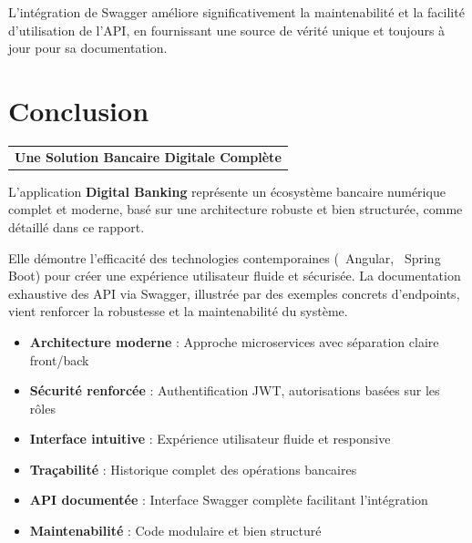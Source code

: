 \documentclass[10pt]{article}
\begin{document}
L'intégration de Swagger améliore significativement la maintenabilité et la facilité d'utilisation de l'API, en fournissant une source de vérité unique et toujours à jour pour sa documentation.

\newpage

\section{Conclusion}

\sectiondivider

\begin{primarybox}[title=Synthèse du Projet]
    \begin{center}
        \begin{tabular}{c}
            \textbf{\large\sffamily Une Solution Bancaire Digitale Complète}
        \end{tabular}
    \end{center}
    
    L'application \textbf{Digital Banking} représente un écosystème bancaire numérique complet et moderne, 
    basé sur une architecture robuste et bien structurée, comme détaillé dans ce rapport. 
    
    Elle démontre l'efficacité des technologies contemporaines (\faAngular~Angular, \faJava~Spring Boot) 
    pour créer une expérience utilisateur fluide et sécurisée. La documentation exhaustive des API via Swagger, 
    illustrée par des exemples concrets d'endpoints, vient renforcer la robustesse et la maintenabilité du système.
\end{primarybox}

\vspace{1cm}

\begin{secondarybox}[title=Points forts de l'application]
    \begin{itemize}
        \item \textbf{Architecture moderne} : Approche microservices avec séparation claire front/back
        \item \textbf{Sécurité renforcée} : Authentification JWT, autorisations basées sur les rôles
        \item \textbf{Interface intuitive} : Expérience utilisateur fluide et responsive
        \item \textbf{Traçabilité} : Historique complet des opérations bancaires
        \item \textbf{API documentée} : Interface Swagger complète facilitant l'intégration
        \item \textbf{Maintenabilité} : Code modulaire et bien structuré
    \end{itemize}
\end{secondarybox}
\end{document}
